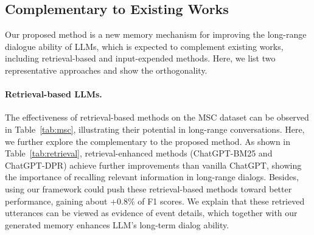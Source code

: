 \documentclass[authoryear,preprint,review,12pt]{elsarticle}
\begin{document}
\subsection{Complementary to Existing Works}
Our proposed method is a new memory mechanism for improving the long-range dialogue ability of LLMs, which is expected to complement existing works, including retrieval-based and input-expended methods. Here, we list two representative approaches and show the orthogonality.
\paragraph{Retrieval-based LLMs.} The effectiveness of retrieval-based methods on the MSC dataset can be observed in Table~\ref{tab:msc}, illustrating their potential in long-range conversations. Here, we further explore the complementary to the proposed method. As shown in Table~\ref{tab:retrieval}, retrieval-enhanced methods (ChatGPT-BM25 and ChatGPT-DPR) achieve further improvements than vanilla ChatGPT, showing the importance of recalling relevant information in long-range dialogs. Besides, using our framework could push these retrieval-based methods toward better performance, gaining about +0.8\% of F1 scores. We explain that these retrieved utterances can be viewed as evidence of event details, which together with our generated memory enhances LLM's long-term dialog ability.
\begin{table}[t]
\centering
\caption{\textbf{Complementarity between ours and retrieval-based methods}, in terms of automatic and LLM's evaluation on session 5 of the MSC dataset.}
\label{tab:retrieval}

\end{table}
\end{document}
